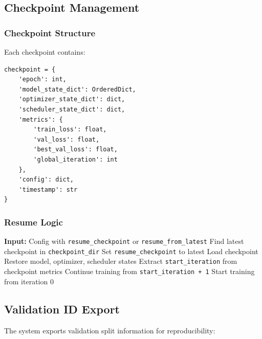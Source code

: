 \documentclass[11pt,a4paper]{article}
\begin{document}
\subsection{Checkpoint Management}

\subsubsection{Checkpoint Structure}

Each checkpoint contains:

\begin{lstlisting}[caption={Checkpoint Contents}]
checkpoint = {
    'epoch': int,
    'model_state_dict': OrderedDict,
    'optimizer_state_dict': dict,
    'scheduler_state_dict': dict,
    'metrics': {
        'train_loss': float,
        'val_loss': float,
        'best_val_loss': float,
        'global_iteration': int
    },
    'config': dict,
    'timestamp': str
}
\end{lstlisting}

\subsubsection{Resume Logic}

\begin{algorithm}
\caption{Resume from Checkpoint}
\begin{algorithmic}[1]
\State \textbf{Input:} Config with \texttt{resume\_checkpoint} or \texttt{resume\_from\_latest}
    \State Find latest checkpoint in \texttt{checkpoint\_dir}
        \State Set \texttt{resume\_checkpoint} to latest
    \EndIf
\EndIf
{}
    \State Load checkpoint
    \State Restore model, optimizer, scheduler states
    \State Extract \texttt{start\_iteration} from checkpoint metrics
    \State Continue training from \texttt{start\_iteration + 1}
\Else
    \State Start training from iteration 0
\EndIf
\end{algorithmic}
\end{algorithm}

\subsection{Validation ID Export}

The system exports validation split information for reproducibility:
\end{document}
